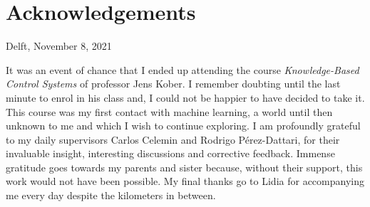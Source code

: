 \chapter*{Acknowledgements}


 \vspace{2cm} 

\begin{flushright}
Delft, November 8, 2021
\end{flushright}

 \vspace{3mm} 

It was an event of chance that I ended up attending the course \textit{Knowledge-Based Control Systems} of professor Jens Kober. I remember doubting until the last minute to enrol in his class and, I could not be happier to have decided to take it. This course was my first contact with machine learning, a world until then unknown to me and which I wish to continue exploring. I am profoundly grateful to my daily supervisors Carlos Celemin and Rodrigo Pérez-Dattari, for their invaluable insight, interesting discussions and corrective feedback. Immense gratitude goes towards my parents and sister because, without their support, this work would not have been possible.
My final thanks go to Lidia for accompanying me every day despite the kilometers in between. 


 \vspace{5mm} 



